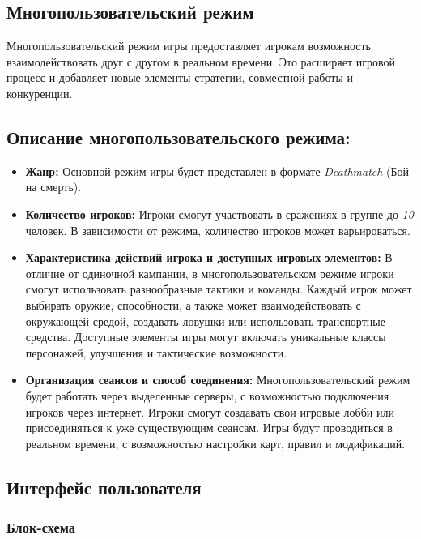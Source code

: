 \documentclass{article}
\begin{document}
\begin{itemize}
\subsection{Многопользовательский режим}
Многопользовательский режим игры предоставляет игрокам возможность взаимодействовать друг с другом в реальном времени. Это расширяет игровой процесс и добавляет новые элементы стратегии, совместной работы и конкуренции.
\subsection{Описание многопользовательского режима:}

\begin{itemize}
    \item \textbf{Жанр:} Основной режим игры будет представлен в формате \textit{Deathmatch} (Бой на смерть).
    
    \item \textbf{Количество игроков:} Игроки смогут участвовать в сражениях в группе до \textit{10} человек. В зависимости от режима, количество игроков может варьироваться.
    
    \item \textbf{Характеристика действий игрока и доступных игровых элементов:} В отличие от одиночной кампании, в многопользовательском режиме игроки смогут использовать разнообразные тактики и команды. Каждый игрок может выбирать оружие, способности, а также может взаимодействовать с окружающей средой, создавать ловушки или использовать транспортные средства. Доступные элементы игры могут включать уникальные классы персонажей, улучшения и тактические возможности.
    
    \item \textbf{Организация сеансов и способ соединения:} Многопользовательский режим будет работать через выделенные серверы, с возможностью подключения игроков через интернет. Игроки смогут создавать свои игровые лобби или присоединяться к уже существующим сеансам. Игры будут проводиться в реальном времени, с возможностью настройки карт, правил и модификаций.
\end{itemize}

\subsection{Интерфейс пользователя}

\subsubsection{Блок-схема}


\end{itemize}
\end{document}
